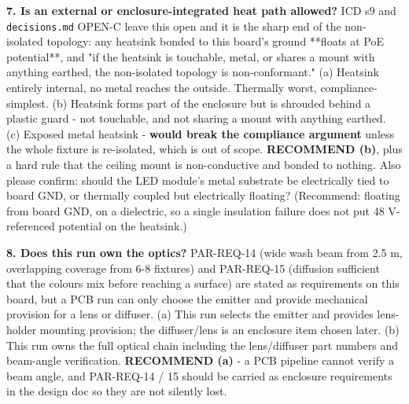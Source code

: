 \documentclass[11pt,a4paper]{article}
\begin{document}
\textbf{7. Is an external or enclosure-integrated heat path allowed?} ICD s9 and \texttt{decisions.md} OPEN-C leave this open and it is the sharp end of the non-isolated topology: any heatsink bonded to this board's ground {*}{*}floats at PoE potential{*}{*}, and "if the heatsink is touchable, metal, or shares a mount with anything earthed, the non-isolated topology is non-conformant." (a) Heatsink entirely internal, no metal reaches the outside. Thermally worst, compliance-simplest. (b) Heatsink forms part of the enclosure but is shrouded behind a plastic guard - not touchable, and not sharing a mount with anything earthed. (c) Exposed metal heatsink - \textbf{would break the compliance argument} unless the whole fixture is re-isolated, which is out of scope. \textbf{RECOMMEND (b)}, plus a hard rule that the ceiling mount is non-conductive and bonded to nothing. Also please confirm: should the LED module's metal substrate be electrically tied to board GND, or thermally coupled but electrically floating? (Recommend: floating from board GND, on a dielectric, so a single insulation failure does not put 48 V-referenced potential on the heatsink.)

\textbf{8. Does this run own the optics?} PAR-REQ-14 (wide wash beam from 2.5 m, overlapping coverage from 6-8 fixtures) and PAR-REQ-15 (diffusion sufficient that the colours mix before reaching a surface) are stated as requirements on this board, but a PCB run can only choose the emitter and provide mechanical provision for a lens or diffuser. (a) This run selects the emitter and provides lens-holder mounting provision; the diffuser/lens is an enclosure item chosen later. (b) This run owns the full optical chain including the lens/diffuser part numbers and beam-angle verification. \textbf{RECOMMEND (a)} - a PCB pipeline cannot verify a beam angle, and PAR-REQ-14 / 15 should be carried as enclosure requirements in the design doc so they are not silently lost.
\end{document}

